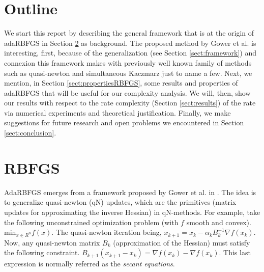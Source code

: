 \documentclass[12pt,conference,compsocconf]{IEEEtran}
\begin{document}
\section{Outline}
We start this report by describing the general framework that is at the origin of adaRBFGS in Section \ref{sect:rbfgs} as background. The proposed method by Gower et al. is interesting, first, because of the generalization (see Section \ref{sect:framework}) and connexion this framework makes with previously well known family of methods such as quasi-newton and simultaneous Kaczmarz just to name a few. Next, we mention, in Section \ref{sect:propertiesRBFGS}, some results and properties of adaRBFGS that will be useful for our complexity analysis. We will, then, show our results with respect to the rate complexity (Section \ref{sect:results}) of the rate via numerical experiments and theoretical justification. Finally, we make suggestions for future research and open problems we encountered in Section \ref{sect:conclusion}.

\section{RBFGS}\label{sect:rbfgs}
AdaRBFGS emerges from a framework proposed by Gower et al. in \cite{Gower1,Gower2}. The idea is to generalize quasi-newton (qN) updates, which are the primitives (matrix updates for approximating the inverse Hessian) in qN-methods. For example, take the following unconstrained optimization problem (with $f$ smooth and convex).
$\text{min}_{x \in R^n} f(x)$. The quasi-newton iteration being, $x_{k+1}=x_k-\alpha_kB_k^{-1}\nabla f(x_k)$. Now, any quasi-newton matrix $B_k$ (approximation of the Hessian) must satisfy the following constraint. $B_{k+1}(x_{k+1}-x_k)=\nabla f(x_k)-\nabla f(x_k)$. This last expression is normally referred as the \textit{secant equations}.
\end{document}
